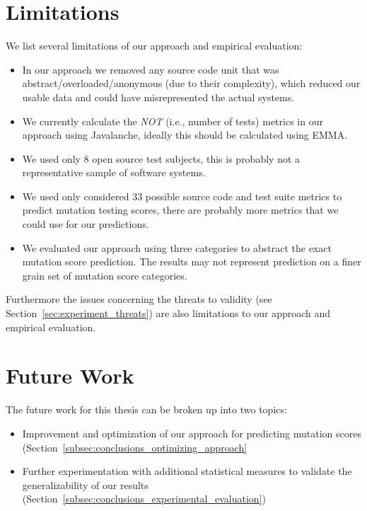 \section{Limitations}
\label{sec:conclusions_limitations}
We list several limitations of our approach and empirical evaluation:

\begin{itemize}
	\item In our approach we removed any source code unit that was abstract/overloaded/anonymous (due to their complexity), which reduced our usable data and could have misrepresented the actual systems.
	\item We currently calculate the \emph{NOT} (i.e., number of tests) metrics in our approach using Javalanche, ideally this should be calculated using EMMA.
	\item We used only 8 open source test subjects, this is probably not a representative sample of software systems.
	\item We used only considered 33 possible source code and test suite metrics to predict mutation testing scores, there are probably more metrics that we could use for our predictions.
	\item We evaluated our approach using three categories to abstract the exact mutation score prediction. The results may not represent prediction on a finer grain set of mutation score categories.
\end{itemize}

Furthermore the issues concerning the threats to validity (see Section~\ref{sec:experiment_threats}) are also limitations to our approach and empirical evaluation.


\section{Future Work}
\label{sec:conclusions_future_work}
The future work for this thesis can be broken up into two topics:

\begin{itemize}
  \item Improvement and optimization of our approach for predicting mutation scores (Section~\ref{subsec:conclusions_optimizing_approach}
  \item Further experimentation with additional statistical measures to validate the generalizability of our results (Section~\ref{subsec:conclusions_experimental_evaluation})
\end{itemize}

